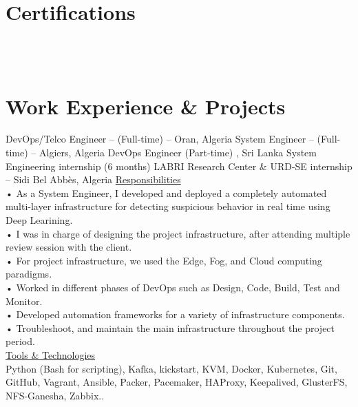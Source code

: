 \documentclass{cv}
\begin{document}
\section{Certifications}
  \\
  \\

\section{Work Experience \& Projects}
{DevOps/Telco Engineer -- (Full-time)}
{\lab -- Oran, Algeria\vspace{.3cm}}
{}
{System Engineer -- (Full-time)}
{\umtk -- Algiers, Algeria\vspace{.3cm}}
{}
{DevOps Engineer (Part-time)}
{\keeneye, Sri Lanka}
{}
    {System Engineering internship (6 months)
    }
    {LABRI Research Center  \& URD-SE internship -- Sidi Bel Abbès, Algeria\vspace{.3cm}}
    {
      \underline {Responsibilities}\vspace{.3cm}\\
      • As a System Engineer, I developed and deployed a completely automated multi-layer infrastructure 
      for detecting suspicious behavior in real time using Deep Learining.\\
      • I was in charge of designing the project infrastructure, after attending multiple review session 
      with the client.\\
      • For project infrastructure, we used the Edge, Fog, and Cloud computing paradigms.\\
      • Worked in different phases of DevOps such as Design, Code, Build, Test and Monitor.\\
      • Developed automation frameworks for a variety of infrastructure components.\\
      • Troubleshoot, and maintain the main infrastructure throughout the project period.\\
      \underline {Tools \& Technologies}\\
      Python (Bash for scripting), Kafka, kickstart, KVM, Docker, Kubernetes, Git, GitHub, Vagrant, Ansible, Packer, Pacemaker, HAProxy, Keepalived, GlusterFS, NFS-Ganesha, Zabbix..\\
    }
\end{document}
